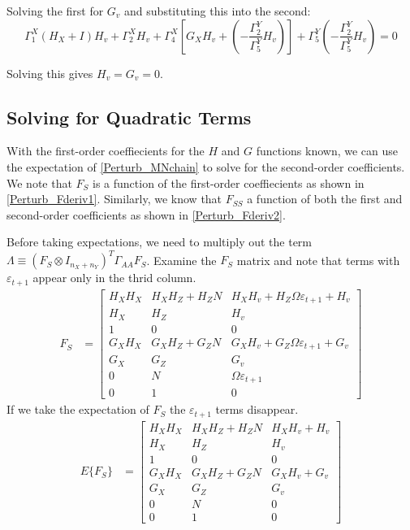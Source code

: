 \documentclass[letterpaper,12pt]{article}
\newcommand{\ve}{\varepsilon}
\theoremstyle{definition}
\begin{document}
\begin{spacing}{1.5}
		Solving the first for $G_v$ and substituting this into the second:
		\begin{equation}
			\Gamma^X_1 (H_X + I) H_v + \Gamma^X_2 H_v + \Gamma^X_4 \left[G_X H_v + \left(- \frac{\Gamma^Y_2}{\Gamma^Y_5} H_v \right) \right] + \Gamma^Y_5 \left(- \frac{\Gamma^Y_2}{\Gamma^Y_5} H_v \right) = 0 \nonumber
		\end{equation}

		Solving this gives $H_v = G_v = 0$.

	\subsection{Solving for Quadratic Terms}
		With the first-order coeffiecients for the $H$ and $G$ functions known, we can use the expectation of \eqref{Perturb_MNchain} to solve for the second-order coefficients.  We note that $F_S$ is a function of the first-order coeffiecients as shown in \eqref{Perturb_Fderiv1}.  Similarly, we know that $F_{SS}$ a function of both the first and second-order coefficients as shown in \eqref{Perturb_Fderiv2}.

		Before taking expectations, we need to multiply out the term $\Lambda \equiv (F_S \otimes I_{n_X+n_Y})^T \Gamma_{AA} F_S$.  Examine the $F_S$ matrix and note that terms with $\ve_{t+1}$ appear only in the thrid column.
		\begin{align}
			F_S & = \begin{bmatrix} H_X H_X & 
			H_X H_Z + H_Z N & 
			H_X H_v + H_Z \Omega \ve_{t+1} + H_v \\ 
			H_X & H_Z & H_v \\ 1 & 0 & 0 \\ 
			G_X H_X & 
			G_X H_Z + G_Z N & 
			G_X H_v + G_Z \Omega \ve_{t+1} + G_v \\ 
			G_X & G_Z & G_v \\ 0 & N & \Omega \ve_{t+1} \\ 
			0 & 1 & 0 \end{bmatrix}\nonumber
		\end{align}
		If we take the expectation of $F_S$ the $\ve_{t+1}$ terms disappear.
			\begin{align}
			E\{F_S\} & = \begin{bmatrix} H_X H_X & 
			H_X H_Z + H_Z N & 
			H_X H_v + H_v \\ 
			H_X & H_Z & H_v \\ 1 & 0 & 0 \\ 
			G_X H_X & 
			G_X H_Z + G_Z N & 
			G_X H_v + G_v \\ 
			G_X & G_Z & G_v \\ 0 & N & 0 \\ 
			0 & 1 & 0 \end{bmatrix}\nonumber
		\end{align}


\end{spacing}
\end{document}
